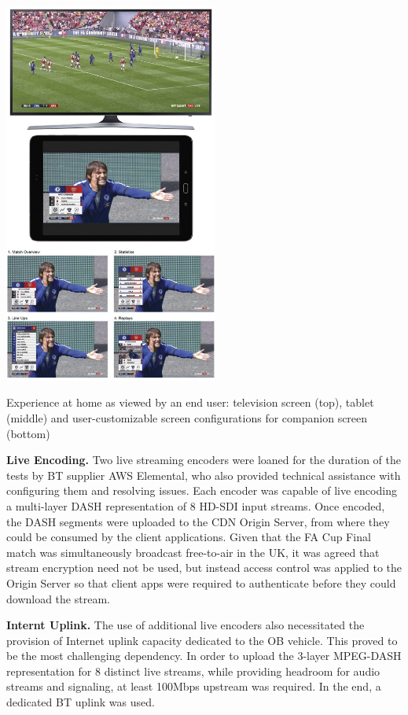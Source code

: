 \documentclass[sigchi-a, authorversion]{acmart}
\begin{document}
\begin{marginfigure}
\hspace*{-0.5cm}
    \includegraphics[width=7cm]{Figures/footballathome1.jpg}
    
    \caption{Experience at home as viewed by an end user: television screen (top), tablet (middle) and user-customizable screen configurations for companion screen (bottom)}
    \label{fig:homeexperience}
\end{marginfigure}

\vspace{5pt}\noindent\textbf{Live Encoding.} Two live streaming encoders were loaned for the duration
of the tests by BT supplier AWS Elemental, who also provided technical assistance
with configuring them and resolving issues. Each encoder was capable of live
encoding a multi-layer DASH representation of 8 HD-SDI input streams. Once
encoded, the DASH segments were uploaded to the CDN Origin Server, from where
they could be consumed by the client applications. Given that the FA Cup Final
match was simultaneously broadcast free-to-air in the UK, it was agreed that
stream encryption need not be used, but instead access control was applied to
the Origin Server so that client apps were required to authenticate before they
could download the stream.

\vspace{5pt}\noindent\textbf{Internt Uplink.} The use of additional live encoders also necessitated
the provision of Internet uplink capacity dedicated to the OB vehicle. This
proved to be the most challenging dependency. In order to upload the 3-layer
MPEG-DASH representation for 8 distinct live streams, while providing headroom
for audio streams and signaling, at least 100Mbps upstream was required. In the
end, a dedicated BT uplink was used.
\end{document}
